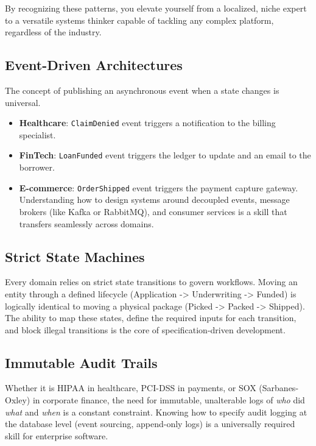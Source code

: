 \documentclass[
  11pt,
  openany,
  oneside]{book}
\providecommand{\tightlist}{%
  \setlength{\itemsep}{0pt}\setlength{\parskip}{0pt}}
\begin{document}
By recognizing these patterns, you elevate yourself from a localized,
niche expert to a versatile systems thinker capable of tackling any
complex platform, regardless of the industry.

\subsection{Event-Driven
Architectures}\label{event-driven-architectures}

The concept of publishing an asynchronous event when a state changes is
universal.

\begin{itemize}
\tightlist
\item
  \textbf{Healthcare}: \texttt{ClaimDenied} event triggers a
  notification to the billing specialist.
\item
  \textbf{FinTech}: \texttt{LoanFunded} event triggers the ledger to
  update and an email to the borrower.
\item
  \textbf{E-commerce}: \texttt{OrderShipped} event triggers the payment
  capture gateway. Understanding how to design systems around decoupled
  events, message brokers (like Kafka or RabbitMQ), and consumer
  services is a skill that transfers seamlessly across domains.
\end{itemize}

\subsection{Strict State Machines}\label{strict-state-machines}

Every domain relies on strict state transitions to govern workflows.
Moving an entity through a defined lifecycle (Application
-\textgreater{} Underwriting -\textgreater{} Funded) is logically
identical to moving a physical package (Picked -\textgreater{} Packed
-\textgreater{} Shipped). The ability to map these states, define the
required inputs for each transition, and block illegal transitions is
the core of specification-driven development.

\subsection{Immutable Audit Trails}\label{immutable-audit-trails}

Whether it is HIPAA in healthcare, PCI-DSS in payments, or SOX
(Sarbanes-Oxley) in corporate finance, the need for immutable,
unalterable logs of \emph{who} did \emph{what} and \emph{when} is a
constant constraint. Knowing how to specify audit logging at the
database level (event sourcing, append-only logs) is a universally
required skill for enterprise software.
\end{document}
